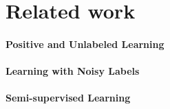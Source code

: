 \section{Related work}
\label{related}

\paragraph{Positive and Unlabeled Learning}

\paragraph{{Learning with Noisy Labels}}

\paragraph{Semi-supervised Learning}
